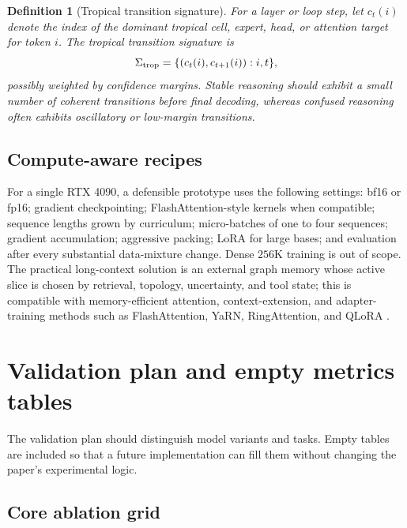 \documentclass[11pt]{article}
\newtheorem{definition}{Definition}[section]
\newcommand{\1}{\mathbf{1}}
\begin{document}
\begin{definition}[Tropical transition signature]
For a layer or loop step, let $c_t(i)$ denote the index of the dominant tropical cell, expert, head, or attention target for token $i$. The tropical transition signature is
\[
\Sigma_{\rm trop}=\{(c_t(i),c_{t+1}(i)): i,t\},
\]
possibly weighted by confidence margins. Stable reasoning should exhibit a small number of coherent transitions before final decoding, whereas confused reasoning often exhibits oscillatory or low-margin transitions.
\end{definition}

\subsection{Compute-aware recipes}

For a single RTX 4090, a defensible prototype uses the following settings: bf16 or fp16; gradient checkpointing; FlashAttention-style kernels when compatible; sequence lengths grown by curriculum; micro-batches of one to four sequences; gradient accumulation; aggressive packing; LoRA for large bases; and evaluation after every substantial data-mixture change. Dense $256$K training is out of scope. The practical long-context solution is an external graph memory whose active slice is chosen by retrieval, topology, uncertainty, and tool state; this is compatible with memory-efficient attention, context-extension, and adapter-training methods such as FlashAttention, YaRN, RingAttention, and QLoRA \cite{FlashAttention2022,FlashAttention2,YaRN2023,RingAttention2024,QLoRA2023}.

\section{Validation plan and empty metrics tables}
\label{sec:validation-plan}

The validation plan should distinguish model variants and tasks. Empty tables are included so that a future implementation can fill them without changing the paper's experimental logic.

\subsection{Core ablation grid}
\end{document}
